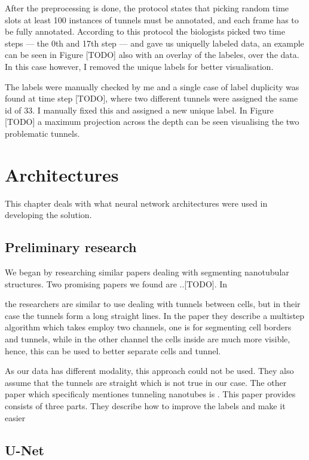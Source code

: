 \documentclass[
  digital,     %
  oneside,     %
  nosansbold,  %
  nocolorbold, %
  lof,         %
  lot,         %
]{fithesis4}
\begin{document}
After the preprocessing is done, the protocol states that picking random time
slots at least 100 instances of tunnels must be annotated, and each frame has to
be fully annotated. According to this protocol the biologists picked two time
steps --- the 0th and 17th step --- and gave us uniquelly labeled data, an
example can be seen in Figure [TODO] also with an overlay of the labeles, over
the data. In this case however, I removed the unique labels for better
visualisation.

The labels were manually checked by me and a single case of label duplicity was
found at time step [TODO], where two different tunnels were assigned the same id
of 33. I manually fixed this and assigned a new unique label. In Figure [TODO] a
maximum projection across the depth can be seen visualising the two problematic
tunnels.

\chapter{Architectures}
This chapter deals with what neural network architectures were used in
developing the solution.

\section{Preliminary research}
We began by researching similar papers dealing with segmenting nanotubular
structures. Two promising papers we found are ..[TODO]. In

\parencite{Hodneland2006Automated} the researchers are similar to use dealing
with tunnels between cells, but in their case the tunnels form a long straight
lines. In the paper they describe a multistep algorithm which takes employ two
channels, one is for segmenting cell borders and tunnels, while in the other
channel the cells inside are much more visible, hence, this can be used to
better separate cells and tunnel.

As our data has different modality, this approach could not be used. They also
assume that the tunnels are straight which is not true in our case.
The other paper which specificaly mentiones tunneling nanotubes is
\parencite{Ceran2022TNTdetect}. This paper provides consists of three parts.
They describe how to improve the labels and make it easier 

\section{U-Net}
\end{document}
